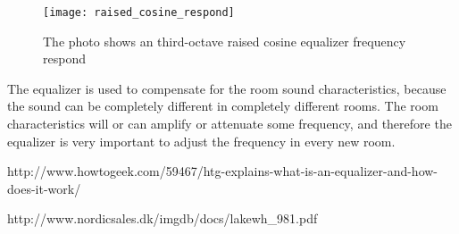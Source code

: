 \begin{figure} [htbp]
 \centering
  \texttt{[image: raised\_cosine\_respond]}
  \caption{The photo shows an third-octave raised cosine equalizer frequency respond  %
  }
  \label{fig:raised_cosine_respond}
\end{figure}


The equalizer is used to compensate for the room sound characteristics, because the sound can be completely different in completely different rooms. The room characteristics will or can amplify or attenuate some frequency, and therefore the equalizer is very important to adjust the frequency in every new room. 



http://www.howtogeek.com/59467/htg-explains-what-is-an-equalizer-and-how-does-it-work/

http://www.nordicsales.dk/imgdb/docs/lakewh_981.pdf
